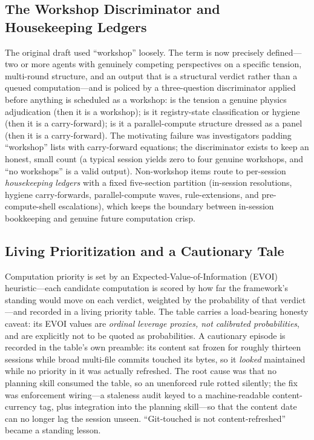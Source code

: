 \documentclass[12pt,a4paper]{article}
\begin{document}
\subsection{The Workshop Discriminator and Housekeeping Ledgers}
\label{sec:floor-workshop}

The original draft used ``workshop'' loosely. The term is now precisely defined---two or more agents with genuinely competing perspectives on a specific tension, multi-round structure, and an output that is a structural verdict rather than a queued computation---and is policed by a three-question discriminator applied before anything is scheduled as a workshop: is the tension a genuine physics adjudication (then it is a workshop); is it registry-state classification or hygiene (then it is a carry-forward); is it a parallel-compute structure dressed as a panel (then it is a carry-forward). The motivating failure was investigators padding ``workshop'' lists with carry-forward equations; the discriminator exists to keep an honest, small count (a typical session yields zero to four genuine workshops, and ``no workshops'' is a valid output). Non-workshop items route to per-session \emph{housekeeping ledgers} with a fixed five-section partition (in-session resolutions, hygiene carry-forwards, parallel-compute waves, rule-extensions, and pre-compute-shell escalations), which keeps the boundary between in-session bookkeeping and genuine future computation crisp.

\subsection{Living Prioritization and a Cautionary Tale}
\label{sec:floor-evoi}

Computation priority is set by an Expected-Value-of-Information (EVOI) heuristic---each candidate computation is scored by how far the framework's standing would move on each verdict, weighted by the probability of that verdict---and recorded in a living priority table. The table carries a load-bearing honesty caveat: its EVOI values are \emph{ordinal leverage proxies, not calibrated probabilities}, and are explicitly not to be quoted as probabilities. A cautionary episode is recorded in the table's own preamble: its content sat frozen for roughly thirteen sessions while broad multi-file commits touched its bytes, so it \emph{looked} maintained while no priority in it was actually refreshed. The root cause was that no planning skill consumed the table, so an unenforced rule rotted silently; the fix was enforcement wiring---a staleness audit keyed to a machine-readable content-currency tag, plus integration into the planning skill---so that the content date can no longer lag the session unseen. ``Git-touched is not content-refreshed'' became a standing lesson.
\end{document}
